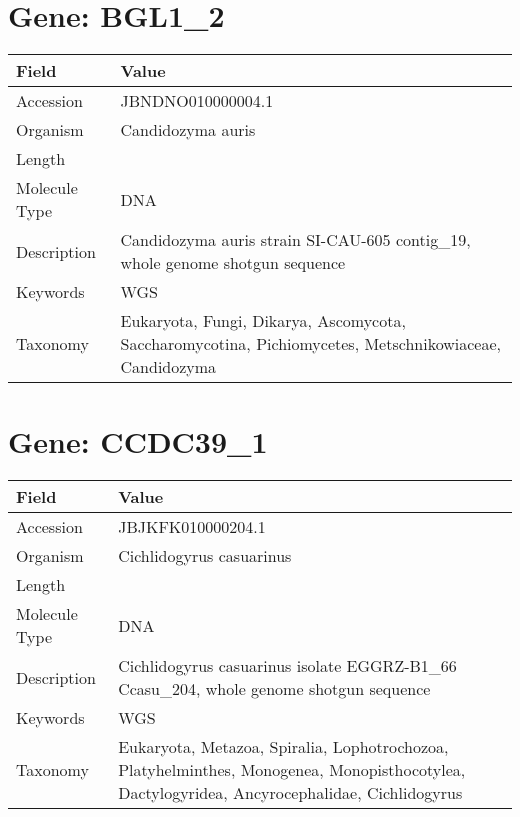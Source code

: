 \documentclass[10pt]{article}
\begin{document}
\section{Gene: BGL1\_2}
{\footnotesize
\begin{longtable}{>{\raggedright\arraybackslash}p{4.5cm} >{\raggedright\arraybackslash}p{11.5cm}}
\textbf{Field} & \textbf{Value} \\
\hline
Accession & JBNDNO010000004.1 \\
Organism & Candidozyma auris \\
Length & 779708 \\
Molecule Type & DNA \\
Description & Candidozyma auris strain SI-CAU-605 contig\_19, whole genome shotgun sequence \\
Keywords & WGS \\
Taxonomy & Eukaryota, Fungi, Dikarya, Ascomycota, Saccharomycotina, Pichiomycetes, Metschnikowiaceae, Candidozyma \\
\end{longtable}
}

\vspace{1em}
\section{Gene: CCDC39\_1}
{\footnotesize
\begin{longtable}{>{\raggedright\arraybackslash}p{4.5cm} >{\raggedright\arraybackslash}p{11.5cm}}
\textbf{Field} & \textbf{Value} \\
\hline
Accession & JBJKFK010000204.1 \\
Organism & Cichlidogyrus casuarinus \\
Length & 37423 \\
Molecule Type & DNA \\
Description & Cichlidogyrus casuarinus isolate EGGRZ-B1\_66 Ccasu\_204, whole genome shotgun sequence \\
Keywords & WGS \\
Taxonomy & Eukaryota, Metazoa, Spiralia, Lophotrochozoa, Platyhelminthes, Monogenea, Monopisthocotylea, Dactylogyridea, Ancyrocephalidae, Cichlidogyrus \\
\end{longtable}
}

\vspace{1em}
\end{document}
